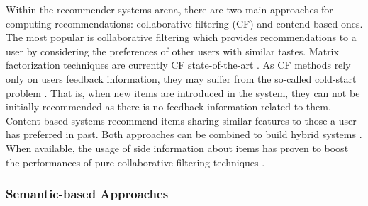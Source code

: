 Within the recommender systems arena, there are two main approaches for computing recommendations: collaborative filtering (CF) and contend-based ones.
The most popular is collaborative filtering which provides recommendations to a user by considering the preferences of other users with similar tastes. 
Matrix factorization techniques are currently CF state-of-the-art \citep{Koren2009}. 
As CF methods rely only on users feedback information, they may suffer from the so-called cold-start problem \citep{Saveski2014}. That is, when new items are introduced in the system, they can not be initially recommended as there is no feedback information related to them.
Content-based
systems recommend items sharing similar features to those a user has preferred in past. 
Both approaches can be combined to build hybrid systems \cite{Burke2002}. 
When available, the usage of side information about items has proven to boost the performances of pure collaborative-filtering techniques \cite{Ning12}. %



\subsubsection{Semantic-based Approaches}
\label{sec:SOA:mir:recommendation:semantic}

